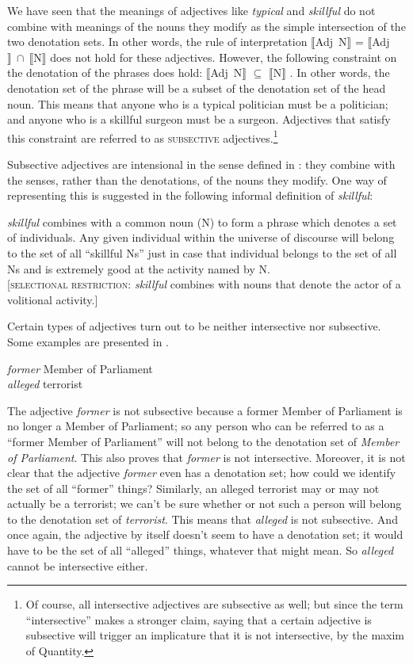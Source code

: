 We have seen that the meanings of adjectives like \textit{typical} and \textit{skillful} do not combine with meanings of the nouns they modify as the simple intersection of the two denotation sets. In other words, the rule of interpretation $\llbracket$Adj~N$\rrbracket$  = $\llbracket$Adj$\rrbracket~{\cap}~\llbracket$N$\rrbracket$  does not hold for these adjectives. However, the following constraint on the denotation of the phrases does hold: $\llbracket$Adj~N$\rrbracket$  ${\subseteq}$ $\llbracket$N$\rrbracket$ . In other words, the denotation set of the phrase will be a subset of the denotation set of the head noun. This means that anyone who is a typical politician must be a politician; and anyone who is a skillful surgeon must be a surgeon. Adjectives that satisfy this constraint are referred to as \textsc{subsective} adjectives.\footnote{Of course, all intersective adjectives are subsective as well; but since the term “intersective” makes a stronger claim, saying that a certain adjective is subsective will trigger an implicature that it is not intersective, by the maxim of Quantity.}



Subsective adjectives are intensional in the sense defined in : they combine with the senses, rather than the denotations, of the nouns they modify. One way of representing this is suggested in the following informal definition of \textit{skillful}:


\eanoraggedright \label{ex:15.9}
\textit{skillful} combines with a common noun (N) to form a phrase which denotes a set of individuals. Any given individual within the universe of discourse will belong to the set of all “skillful Ns” just in case that individual belongs to the set of all Ns and is extremely good at the activity named by N.\\
{}[\textsc{selectional restriction}: \textit{skillful} combines with nouns that denote the actor of a volitional activity.]
\z


Certain types of adjectives turn out to be neither intersective nor subsective. Some examples are presented in .


\ea \label{ex:15.10}
\ea  \textit{former} Member of Parliament\\
\ex \textit{alleged} terrorist
\z \z


The adjective \textit{former} is not subsective because a former Member of Parliament is no longer a Member of Parliament; so any person who can be referred to as a “former Member of Parliament” will not belong to the denotation set of \textit{Member of Parliament}. This also proves that \textit{former} is not intersective. Moreover, it is not clear that the adjective \textit{former} even has a denotation set; how could we identify the set of all “former” things? Similarly, an alleged terrorist may or may not actually be a terrorist; we can’t be sure whether or not such a person will belong to the denotation set of \textit{terrorist}. This means that \textit{alleged} is not subsective. And once again, the adjective by itself doesn’t seem to have a denotation set; it would have to be the set of all “alleged” things, whatever that might mean. So \textit{alleged} cannot be intersective either.



